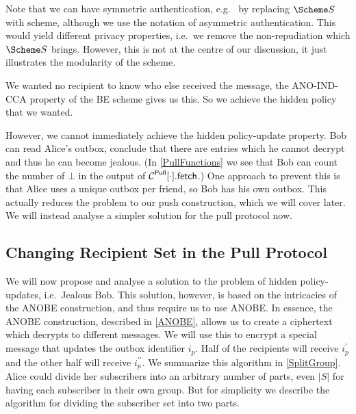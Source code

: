 Note that we can have symmetric authentication, e.g.\  by replacing 
\(\S\) with  scheme, although we use the notation of asymmetric 
authentication.
This would yield different privacy properties, i.e.\ we remove the 
non-repudiation which \(\S\) brings.
However, this is not at the centre of our discussion, it just illustrates the 
modularity of the scheme.

We wanted no recipient to know who else received the message, the ANO-IND-CCA 
property of the \ac{BE} scheme gives us this.
So we achieve the hidden policy that we wanted.

However, we cannot immediately achieve the hidden policy-update property.
Bob can read Alice's outbox, conclude that there are entries which he cannot 
decrypt and thus he can become jealous.
(In \cref{PullFunctions} we see that Bob can count the number of \(\bot\) in 
the output of \(\pget{\cdot}\).)
One approach to prevent this is that Alice uses a unique outbox per friend, so 
Bob has his own outbox.
This actually reduces the problem to our push construction, which we will cover 
later.
We will instead analyse a simpler solution for the pull protocol now.

\subsection{Changing Recipient Set in the Pull Protocol}
\label{ChangingPullRecipientSet}

We will now propose and analyse a solution to the problem of hidden 
policy-updates, i.e.\ Jealous Bob.
This solution, however, is based on the intricacies of the \ac{ANOBE} 
construction, and thus require us to use \ac{ANOBE}.
In essence, the \ac{ANOBE} construction, described in \cref{ANOBE}, allows us 
to create a ciphertext which decrypts to different messages.
We will use this to encrypt a special message that updates the outbox 
identifier \(i_p\).
Half of the recipients will receive \(i_p^\prime\) and the other half will 
receive \(i_p^{\prime\prime}\).
We summarize this algorithm in \cref{SplitGroup}.
Alice could divide her subscribers into an arbitrary number of parts, even 
\(|S|\) for having each subscriber in their own group.
But for simplicity we describe the algorithm for dividing the subscriber set 
into two parts.

